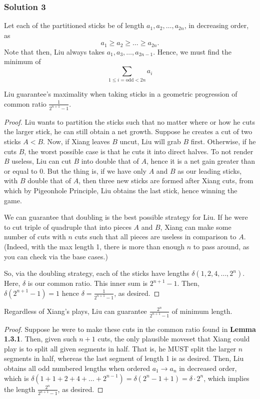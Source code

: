 \documentclass[11pt]{article}
\begin{document}
\subsubsection{Solution 3}
Let each of the partitioned sticks be of length $a_1, a_2, \dots, a_{2n}$, in decreasing order, as $$a_1 \geq a_2 \geq \dots \geq a_{2n}.$$ Note that then, Liu always takes $a_1, a_3, \dots, a_{2n-1}$. Hence, we must find the minimum of
\[\sum_{1 \leq i = \text{odd} < 2n} a_i\]
\begin{lemma}
    Liu guarantee's maximality when taking sticks in a geometric progression of common ratio $\frac{1}{2^{n+1} -1}$.
\end{lemma}
\begin{proof}
    Liu wants to partition the sticks such that no matter where or how he cuts the larger stick, he can still obtain a net growth. Suppose he creates a cut of two sticks $A < B$. Now, if Xiang leaves $B$ uncut, Liu will grab $B$ first. Otherwise, if he cuts $B$, the worst possible case is that he cuts it into direct halves. To not render $B$ useless, Liu can cut $B$ into double that of $A$, hence it is a net gain greater than or equal to 0. But the thing is, if we have only $A$ and $B$ as our leading sticks, with $B$ double that of $A$, then three new sticks are formed after Xiang cuts, from which by Pigeonhole Principle, Liu obtains the last stick, hence winning the game.

\medskip
We can guarantee that doubling is the best possible strategy for Liu. If he were to cut triple of quadruple that into pieces $A$ and $B$, Xiang can make some number of cuts with $n$ cuts such that all pieces are useless in comparison to $A$. (Indeed, with the max length 1, there is more than enough $n$ to pass around, as you can check via the base cases.)

\medskip
So, via the doubling strategy, each of the sticks have lengths $\delta(1, 2, 4, \dots, 2^n)$. Here, $\delta$ is our common ratio. This inner sum is $2^{n+1}-1$. Then, $\delta(2^{n+1} -1) = 1$ hence $\delta = \frac{1}{2^{n+1} -1}$, as desired.
\end{proof}
\begin{lemma}
    Regardless of Xiang's plays, Liu can guarantee $\frac{2^n}{2^{n+1} -1}$ of minimum length.
\end{lemma}
\begin{proof}
    Suppose he were to make these cuts in the common ratio found in \textcolor{BrightAqua}{\textbf{Lemma 1.3.1}}. Then, given such $n+1$ cuts, the only plausible moveset that Xiang could play is to split all given segments in half. That is, he MUST split the larger $n$ segments in half, whereas the last segment of length 1 is as desired. Then, Liu obtains all odd numbered lengths when ordered $a_1 \rightarrow a_n$ in decreased order, which is $\delta(1+1+2+4+\dots+2^{n-1}) = \delta(2^n - 1 + 1)= \delta \cdot 2^n$, which implies the length $\frac{2^n}{2^{n+1} - 1}$, as desired.
\end{proof}
\end{document}
